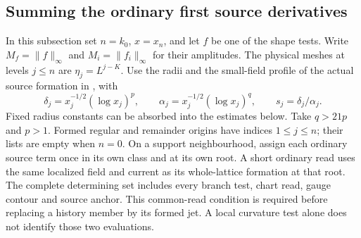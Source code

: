 \documentclass[11pt,letterpaper,reqno]{amsart}
\numberwithin{equation}{section}
\theoremstyle{definition}
\theoremstyle{remark}
\begin{document}
\subsection{Summing the ordinary first source derivatives}
\label{fp:subsec-ordinary-response}

In this subsection set \(n=k_0\), \(x=x_n\), and let \(f\) be one of
the shape tests. Write \(M_f=\|f\|_\infty\) and \(M_i=\|f_i\|_\infty\)
for their amplitudes. The physical meshes at levels \(j\le n\) are
\(\eta_j=L^{j-K}\). Use the radii and the small-field profile of the
actual source formation in \cite{SI}, with
\[
 \delta_j=x_j^{-1/2}(\log x_j)^p,\qquad
 \alpha_j=x_j^{-1/2}(\log x_j)^q,\qquad s_j=\delta_j/\alpha_j.
\]
Fixed radius constants can be absorbed into the estimates below.
Take \(q>21p\) and \(p>1\). Formed regular and remainder
origins have indices \(1\le j\le n\); their lists are empty
when \(n=0\). On a support neighbourhood, assign each ordinary
source term once
in its own class and at its own root. A short ordinary read uses
the same localized field and current as its whole-lattice
formation at that root. The complete determining set includes
every branch test, chart read, gauge contour and source anchor.
This common-read condition is required before replacing a
history member by its formed jet. A local curvature test alone
does not identify those two evaluations.
\end{document}
